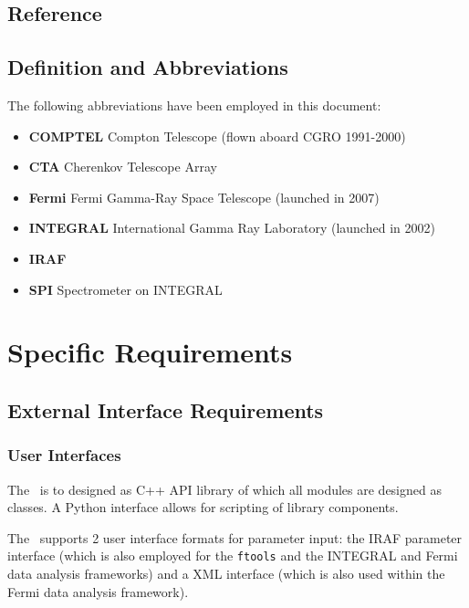 \documentclass{article}[12pt,a4]
\begin{document}
\subsection{Reference}

\subsection{Definition and Abbreviations}

The following abbreviations have been employed in this document:
\begin{itemize}
\item[]{\bf COMPTEL} Compton Telescope (flown aboard CGRO 1991-2000)
\item[]{\bf CTA} Cherenkov Telescope Array
\item[]{\bf Fermi} Fermi Gamma-Ray Space Telescope (launched in 2007)
\item[]{\bf INTEGRAL} International Gamma Ray Laboratory (launched in 2002) 
\item[]{\bf IRAF} 
\item[]{\bf SPI} Spectrometer on INTEGRAL
\end{itemize}


\section{Specific Requirements}

\subsection{External Interface Requirements}

\subsubsection{User Interfaces}

The \this\ is to designed as C++ API library of which all modules are designed as classes.
A Python interface allows for scripting of library components.

The \this\ supports 2 user interface formats for parameter input:
the IRAF parameter interface (which is also employed for the {\tt ftools} and the 
INTEGRAL and Fermi data analysis frameworks)
and a XML interface (which is also used within the Fermi data analysis framework).
\end{document}
